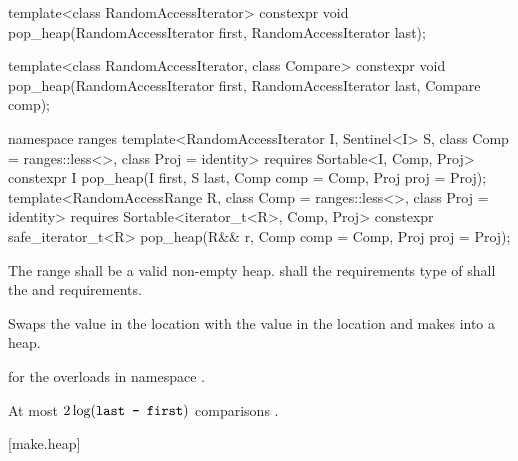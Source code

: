%
\begin{itemdecl}
template<class RandomAccessIterator>
  constexpr void pop_heap(RandomAccessIterator first, RandomAccessIterator last);

template<class RandomAccessIterator, class Compare>
  constexpr void pop_heap(RandomAccessIterator first, RandomAccessIterator last,
                          Compare comp);
\end{itemdecl}
\begin{addedblock}
\begin{itemdecl}
namespace ranges {
  template<RandomAccessIterator I, Sentinel<I> S, class Comp = ranges::less<>,
      class Proj = identity>
    requires Sortable<I, Comp, Proj>
    constexpr I
      pop_heap(I first, S last, Comp comp = Comp{}, Proj proj = Proj{});
  template<RandomAccessRange R, class Comp = ranges::less<>, class Proj = identity>
    requires Sortable<iterator_t<R>, Comp, Proj>
    constexpr safe_iterator_t<R>
      pop_heap(R&& r, Comp comp = Comp{}, Proj proj = Proj{});
}
\end{itemdecl}
\end{addedblock}

\begin{itemdescr}
\pnum
\requires
The range
shall be a valid non-empty heap.
 shall  the
 requirements  type
of  shall  the
 and
 requirements.

\pnum
\effects
Swaps the value in the location 
with the value in the location
and makes
into a heap.

\begin{addedblock}
\pnum
\returns
{} for the overloads in namespace .
\end{addedblock}

\pnum
\complexity
At most
$2 \log(\texttt{last - first})$
comparisons .
\end{itemdescr}


[make.heap]{}

